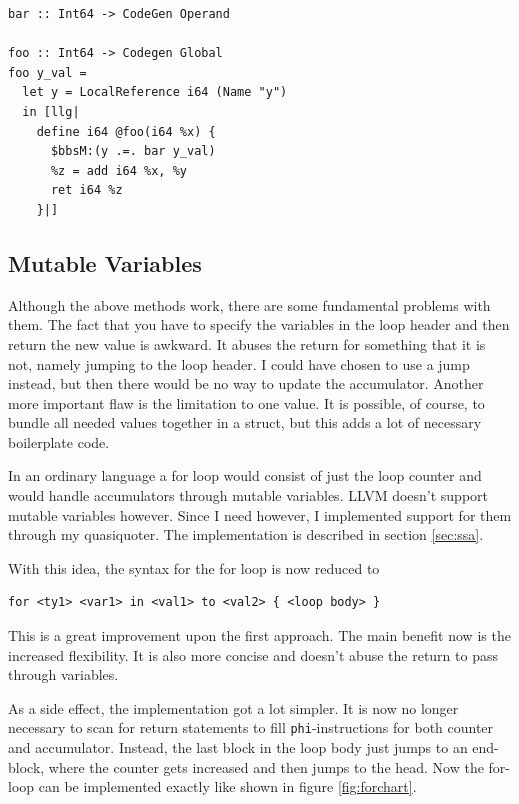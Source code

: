 \documentclass[a4paper,bibliography=totocnumbered,parskip,headsepline]{scrbook}
\begin{document}
\begin{lstlisting}
bar :: Int64 -> CodeGen Operand

foo :: Int64 -> Codegen Global
foo y_val =
  let y = LocalReference i64 (Name "y")
  in [llg|
    define i64 @foo(i64 %x) {
      $bbsM:(y .=. bar y_val)
      %z = add i64 %x, %y
      ret i64 %z
    }|]
\end{lstlisting}


\subsection{Mutable Variables}
Although the above methods work, there are some fundamental problems with them.
The fact that you have to specify the variables in the loop header and then return the new value is awkward.
It abuses the return for something that it is not, namely jumping to the loop header.
I could have chosen to use a jump instead, but then there would be no way to update the accumulator.
Another more important flaw is the limitation to one value.
It is possible, of course, to bundle all needed values together in a struct, but this adds a lot of necessary boilerplate code.

In an ordinary language a for loop would consist of just the loop counter and would handle accumulators through mutable variables.
LLVM doesn't support mutable variables however.
Since I need however, I implemented support for them through my quasiquoter.
The implementation is described in section \ref{sec:ssa}.

\begin{minipage}{\textwidth}
With this idea, the syntax for the for loop is now reduced to
\begin{lstlisting}[numbers=none]
for <ty1> <var1> in <val1> to <val2> { <loop body> }
\end{lstlisting}
\end{minipage}
This is a great improvement upon the first approach.
The main benefit now is the increased flexibility.
It is also more concise and doesn't abuse the return to pass through variables.

As a side effect, the implementation got a lot simpler.
It is now no longer necessary to scan for return statements to fill \lstinline!phi!-instructions for both counter and accumulator.
Instead, the last block in the loop body just jumps to an end-block, where the counter gets increased and then jumps to the head.
Now the for-loop can be implemented exactly like shown in figure \ref{fig:forchart}.
\end{document}
